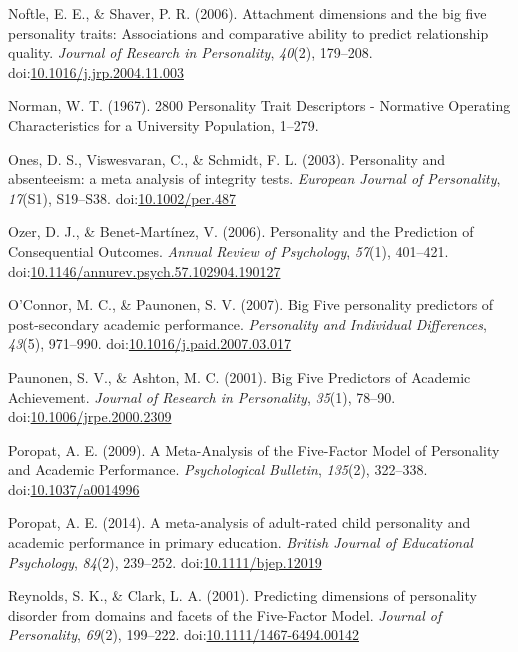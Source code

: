 \documentclass[,man,floatsintext]{apa6}
\begin{document}
\hypertarget{ref-Noftle2006}{}
Noftle, E. E., \& Shaver, P. R. (2006). Attachment dimensions and the
big five personality traits: Associations and comparative ability to
predict relationship quality. \emph{Journal of Research in Personality},
\emph{40}(2), 179--208.
doi:\href{https://doi.org/10.1016/j.jrp.2004.11.003}{10.1016/j.jrp.2004.11.003}

\hypertarget{ref-Norman1967}{}
Norman, W. T. (1967). 2800 Personality Trait Descriptors - Normative
Operating Characteristics for a University Population, 1--279.

\hypertarget{ref-Ones2003}{}
Ones, D. S., Viswesvaran, C., \& Schmidt, F. L. (2003). Personality and
absenteeism: a meta analysis of integrity tests. \emph{European Journal
of Personality}, \emph{17}(S1), S19--S38.
doi:\href{https://doi.org/10.1002/per.487}{10.1002/per.487}

\hypertarget{ref-OzerBenet2006}{}
Ozer, D. J., \& Benet-Martínez, V. (2006). Personality and the
Prediction of Consequential Outcomes. \emph{Annual Review of
Psychology}, \emph{57}(1), 401--421.
doi:\href{https://doi.org/10.1146/annurev.psych.57.102904.190127}{10.1146/annurev.psych.57.102904.190127}

\hypertarget{ref-OConnor2007}{}
O'Connor, M. C., \& Paunonen, S. V. (2007). Big Five personality
predictors of post-secondary academic performance. \emph{Personality and
Individual Differences}, \emph{43}(5), 971--990.
doi:\href{https://doi.org/10.1016/j.paid.2007.03.017}{10.1016/j.paid.2007.03.017}

\hypertarget{ref-Paunonen2001}{}
Paunonen, S. V., \& Ashton, M. C. (2001). Big Five Predictors of
Academic Achievement. \emph{Journal of Research in Personality},
\emph{35}(1), 78--90.
doi:\href{https://doi.org/10.1006/jrpe.2000.2309}{10.1006/jrpe.2000.2309}

\hypertarget{ref-Poropat2009}{}
Poropat, A. E. (2009). A Meta-Analysis of the Five-Factor Model of
Personality and Academic Performance. \emph{Psychological Bulletin},
\emph{135}(2), 322--338.
doi:\href{https://doi.org/10.1037/a0014996}{10.1037/a0014996}

\hypertarget{ref-Poropat2014}{}
Poropat, A. E. (2014). A meta-analysis of adult-rated child personality
and academic performance in primary education. \emph{British Journal of
Educational Psychology}, \emph{84}(2), 239--252.
doi:\href{https://doi.org/10.1111/bjep.12019}{10.1111/bjep.12019}

\hypertarget{ref-ClarkReynolds2001}{}
Reynolds, S. K., \& Clark, L. A. (2001). Predicting dimensions of
personality disorder from domains and facets of the Five-Factor Model.
\emph{Journal of Personality}, \emph{69}(2), 199--222.
doi:\href{https://doi.org/10.1111/1467-6494.00142}{10.1111/1467-6494.00142}
\end{document}
